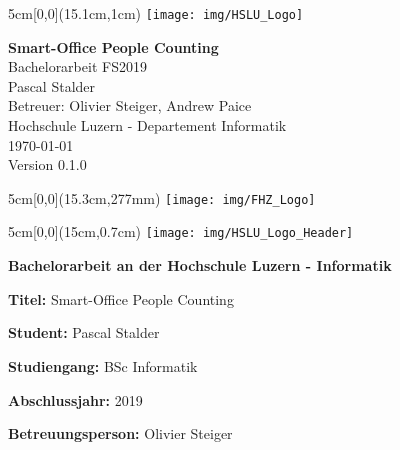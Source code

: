 \begin{titlepage}
	\begin{textblock*}{5cm}[0,0](15.1cm,1cm)
		\texttt{[image: img/HSLU\_Logo]}
	\end{textblock*}
	\begin{center}
		\vspace*{5cm}
		\Huge{\textbf{Smart-Office People Counting}} \\
		\vspace{0.5em}
		\Large{Bachelorarbeit FS2019}\\
		\vspace{3em}
		\LARGE{Pascal Stalder}\\
		\vspace{1em}
		\Large{Betreuer: Olivier Steiger, Andrew Paice}\\
		\vfill
		\large{Hochschule Luzern - Departement Informatik}\\
		\large{\today}\\
		\large{Version 0.1.0}
	\end{center}
	\begin{textblock*}{5cm}[0,0](15.3cm,277mm)
		\texttt{[image: img/FHZ\_Logo]}
	\end{textblock*}
\end{titlepage}

\newpage


\begin{textblock*}{5cm}[0,0](15cm,0.7cm)
	\texttt{[image: img/HSLU\_Logo\_Header]}
\end{textblock*}

\vspace*{1.35cm}

\noindent
\textbf{\Large{Bachelorarbeit an der Hochschule Luzern - Informatik}}

\vspace{0.6cm}
\noindent
\textbf{Titel:} Smart-Office People Counting

\vspace{0.6cm}
\noindent
\textbf{Student:} Pascal Stalder

\vspace{1cm}
\noindent
\textbf{Studiengang:} BSc Informatik

\vspace{0.6cm}
\noindent
\textbf{Abschlussjahr:} 2019

\vspace{0.6cm}
\noindent
\textbf{Betreuungsperson:} Olivier Steiger

